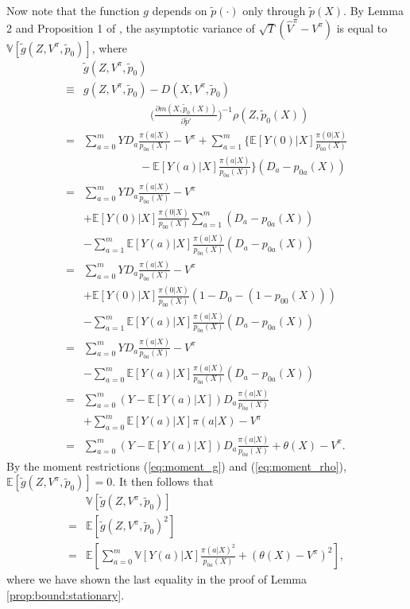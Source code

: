 \documentclass[letterpaper]{article} \usepackage{aaai19}  \usepackage{times}  \usepackage{helvet}  \usepackage{courier}  \usepackage{url}  \usepackage{graphicx}  \frenchspacing  \usepackage{comment}
\newcommand{\citet}[1]
{\citeauthor{#1} \shortcite{#1}}
\begin{document}
Now note that the function $g$ depends on $\tilde p(\cdot)$ only through $\tilde p(X)$.
By Lemma 2 and Proposition 1 of \citet{Ackerberg2014}, the asymptotic variance of $\sqrt{T}(\hat V^{\pi}-V^{\pi})$ is equal to $\mathbb{V}[\tilde g(Z,V^{\pi},\tilde p_0)]$, where
\begin{align*}
	&\tilde g(Z,V^{\pi},\tilde p_0)\\
	\equiv& g(Z,V^{\pi},\tilde p_0)-D(X,V^{\pi},\tilde p_0)\\
	&\hspace{6em}\bigl(\frac{\partial m(X,\tilde p_0(X))}{\partial \tilde p'}\bigr)^{-1}\rho(Z,\tilde p_0(X))\\
	=& \sum_{a=0}^m YD_{a}\frac{\pi(a|X)}{p_{0a}(X)}-V^{\pi}+\sum_{a=1}^m\{\mathbb{E}[Y(0)|X]\frac{\pi(0|X)}{p_{00}(X)}\\
	&\hspace{5em}-\mathbb{E}[Y(a)|X]\frac{\pi(a|X)}{p_{0a}(X)}\}(D_a-p_{0a}(X))\\
	=& \sum_{a=0}^m YD_{a}\frac{\pi(a|X)}{p_{0a}(X)}-V^{\pi}\\
	&+\mathbb{E}[Y(0)|X]\frac{\pi(0|X)}{p_{00}(X)}\sum_{a=1}^m(D_a-p_{0a}(X))\\
	&-\sum_{a=1}^m\mathbb{E}[Y(a)|X]\frac{\pi(a|X)}{p_{0a}(X)}(D_a-p_{0a}(X))\\
	=& \sum_{a=0}^m YD_{a}\frac{\pi(a|X)}{p_{0a}(X)}-V^{\pi}\\
	&+\mathbb{E}[Y(0)|X]\frac{\pi(0|X)}{p_{00}(X)}(1-D_0-(1-p_{00}(X)))\\
	&-\sum_{a=1}^m\mathbb{E}[Y(a)|X]\frac{\pi(a|X)}{p_{0a}(X)}(D_a-p_{0a}(X))\\
	=& \sum_{a=0}^m YD_{a}\frac{\pi(a|X)}{p_{0a}(X)}-V^{\pi}\\
	&-\sum_{a=0}^m\mathbb{E}[Y(a)|X]\frac{\pi(a|X)}{p_{0a}(X)}(D_a-p_{0a}(X))\\
	=& \sum_{a=0}^m (Y-\mathbb{E}[Y(a)|X])D_a\frac{\pi(a|X)}{p_{0a}(X)}\\
	&+\sum_{a=0}^m\mathbb{E}[Y(a)|X]\pi(a|X)-V^{\pi}\\
	=& \sum_{a=0}^m (Y-\mathbb{E}[Y(a)|X])D_a\frac{\pi(a|X)}{p_{0a}(X)}+\theta(X)-V^{\pi}.
\end{align*}
By the moment restrictions (\ref{eq:moment_g}) and (\ref{eq:moment_rho}), $\mathbb{E}[\tilde g(Z,V^{\pi},\tilde p_0)]=0$.
It then follows that
\begin{align*}
	&\mathbb{V}[\tilde g(Z,V^{\pi},\tilde p_0)]\\
	=&\mathbb{E}[\tilde g(Z,V^{\pi},\tilde p_0)^2]\\
	=&\mathbb{E}[\sum_{a=0}^m \mathbb{V}[Y(a)|X]\frac{\pi(a|X)^2}{p_{0a}(X)}+(\theta(X)-V^{\pi})^2],
\end{align*}
where we have shown the last equality in the proof of Lemma \ref{prop:bound:stationary}.
\end{document}
